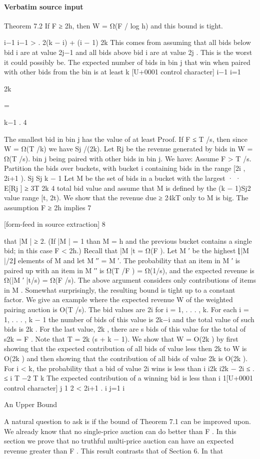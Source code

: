 \documentclass[10pt]{article}
\begin{document}
\paragraph{Verbatim source input}
\begin{ReviewVerbatim}
Theorem 7.2 If F ≥ 2h, then W = Ω(F / log h)
and this bound is tight.

i−1
i−1
>
.
2(k − i) + (i − 1)
2k
This comes from assuming that all bids below bid i
are at value 2j−1 and all bids above bid i are at value
2j . This is the worst it could possibly be. The expected number of bids in bin j that win when paired
with other bids from the bin is at least
k
[U+0001 control character]
i−1
i=1

2k

=

k−1
.
4

The smallest bid in bin j has the value of at least Proof. If F ≤ T /s, then since W = Ω(T /k) we have
Sj /(2k). Let Rj be the revenue generated by bids in W = Ω(T /s).
bin j being paired with other bids in bin j. We have:
Assume F > T /s. Partition the bids over buckets,
with bucket i containing bids in the range [2i , 2i+1 ).
Sj Sj k − 1
Let M be the set of bids in a bucket with the largest
·
·
E[Rj ] ≥
3T 2k
4
total bid value and assume that M is defined by the
(k − 1)Sj2
value range [t, 2t). We show that the revenue due
≥
24kT
only to M is big. The assumption F ≥ 2h implies
7


[form-feed in source extraction]
8

that |M | ≥ 2. (If |M | = 1 than M = {h} and the
previous bucket contains a single bid; in this case
F < 2h.) Recall that |M |t = Ω(F ). Let M ′ be the
highest ⌊|M |/2⌋ elements of M and let M ′′ = M \M ′.
The probability that an item in M ′ is paired up
with an item in M ′′ is Ω(T /F ) = Ω(1/s), and the
expected revenue is Ω(|M ′ |t/s) = Ω(F /s).
The above argument considers only contributions
of items in M . Somewhat surprisingly, the resulting
bound is tight up to a constant factor. We give an example where the expected revenue W of the weighted
pairing auction is O(T /s). The bid values are 2i for
i = 1, . . . , k. For each i = 1, . . . , k − 1 the number
of bids of this value is 2k−i and the total value of
such bids is 2k . For the last value, 2k , there are s
bids of this value for the total of s2k = F . Note that
T = 2k (s + k − 1).
We show that W = O(2k ) by first showing that the
expected contribution of all bids of value less then 2k
to W is O(2k ) and then showing that the contribution
of all bids of value 2k is O(2k ).
For i < k, the probability that a bid of value 2i
wins is less than
i
i2k
i2k − 2i
≤ .
≤
i
T −2
T
k
The expected contribution of a winning bid is less
than
i
1[U+0001 control character] j
1
2 < 2i+1 .
i j=1
i

An Upper Bound

A natural question to ask is if the bound of Theorem 7.1 can be improved upon. We already know
that no single-price auction can do better than F .
In this section we prove that no truthful multi-price
auction can have an expected revenue greater than
F . This result contrasts that of Section 6. In that
\end{ReviewVerbatim}
\end{document}
